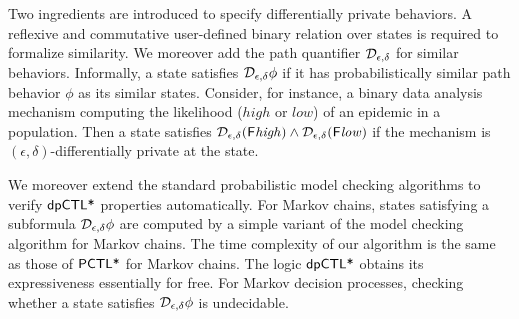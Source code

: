 
Two ingredients are introduced to specify differentially private
behaviors. A reflexive and commutative user-defined binary relation
over states is required to formalize similarity. We moreover add
the path quantifier $\mathcal{D}_{{\epsilon}, {\delta}}$ for similar
behaviors. Informally, a state satisfies $\mathcal{D}_{{\epsilon}, {\delta}}
\phi$ if it has probabilistically similar path behavior $\phi$ as
its similar states. Consider, for instance, a binary data analysis
mechanism computing the likelihood ($\mathit{high}$ or $\mathit{low}$)
of an epidemic in a population. Then a state satisfies
$\mathcal{D}_{{\epsilon}, {\delta}} (\mathsf{F} \mathit{high}) \wedge
\mathcal{D}_{{\epsilon}, {\delta}} (\mathsf{F} \mathit{low})$ if the mechanism is
$(\epsilon, \delta)$-differentially private at the state.



We moreover extend the standard probabilistic model checking
algorithms to verify $\textsf{dpCTL*}$ properties automatically. For Markov
chains, states
satisfying a subformula $\mathcal{D}_{{\epsilon}, {\delta}} \phi$ are computed
by a simple variant of the model checking algorithm for Markov chains.
The time complexity of our algorithm is the same as
those of $\textsf{PCTL*}$ for Markov chains. The logic $\textsf{dpCTL*}$ obtains its
expressiveness essentially for free.
For Markov decision processes, checking whether a state
satisfies $\mathcal{D}_{{\epsilon}, {\delta}} \phi$ is undecidable.


\noindent
